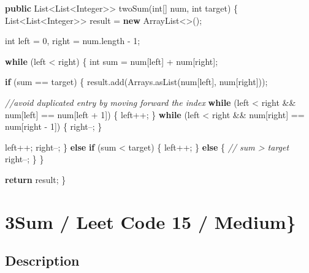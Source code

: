 \documentclass[]{book}
\newenvironment{Shaded}{\begin{snugshade}}{\end{snugshade}}
\newcommand{\BuiltInTok}[1]{#1}
\newcommand{\CommentTok}[1]{\textcolor[rgb]{0.56,0.35,0.01}{\textit{#1}}}
\newcommand{\DataTypeTok}[1]{\textcolor[rgb]{0.13,0.29,0.53}{#1}}
\newcommand{\DecValTok}[1]{\textcolor[rgb]{0.00,0.00,0.81}{#1}}
\newcommand{\FunctionTok}[1]{\textcolor[rgb]{0.00,0.00,0.00}{#1}}
\newcommand{\KeywordTok}[1]{\textcolor[rgb]{0.13,0.29,0.53}{\textbf{#1}}}
\newcommand{\NormalTok}[1]{#1}
\begin{document}
\begin{Shaded}
\begin{Highlighting}[]
\KeywordTok{public} \BuiltInTok{List}\NormalTok{<}\BuiltInTok{List}\NormalTok{<}\BuiltInTok{Integer}\NormalTok{>> }\FunctionTok{twoSum}\NormalTok{(}\DataTypeTok{int}\NormalTok{[] num, }\DataTypeTok{int}\NormalTok{ target) \{}
    \BuiltInTok{List}\NormalTok{<}\BuiltInTok{List}\NormalTok{<}\BuiltInTok{Integer}\NormalTok{>> result = }\KeywordTok{new} \BuiltInTok{ArrayList}\NormalTok{<>();}

    \DataTypeTok{int}\NormalTok{ left = }\DecValTok{0}\NormalTok{, right = num.}\FunctionTok{length}\NormalTok{ - }\DecValTok{1}\NormalTok{;}

    \KeywordTok{while}\NormalTok{ (left < right) \{}
        \DataTypeTok{int}\NormalTok{ sum = num[left] + num[right];}

        \KeywordTok{if}\NormalTok{ (sum == target) \{}
\NormalTok{            result.}\FunctionTok{add}\NormalTok{(}\BuiltInTok{Arrays}\NormalTok{.}\FunctionTok{asList}\NormalTok{(num[left], num[right]));}

            \CommentTok{//avoid duplicated entry by moving forward the index}
            \KeywordTok{while}\NormalTok{ (left < right && num[left] == num[left + }\DecValTok{1}\NormalTok{]) \{}
\NormalTok{                left++;}
\NormalTok{            \}}
            \KeywordTok{while}\NormalTok{ (left < right && num[right] == num[right - }\DecValTok{1}\NormalTok{]) \{}
\NormalTok{                right--;}
\NormalTok{            \}}

\NormalTok{            left++;}
\NormalTok{            right--;}
\NormalTok{        \} }\KeywordTok{else} \KeywordTok{if}\NormalTok{ (sum < target) \{}
\NormalTok{            left++;}
\NormalTok{        \} }\KeywordTok{else}\NormalTok{ \{}
            \CommentTok{// sum > target}
\NormalTok{            right--;}
\NormalTok{        \}}
\NormalTok{    \}}

    \KeywordTok{return}\NormalTok{ result;}
\NormalTok{\}}
\end{Highlighting}
\end{Shaded}

\hypertarget{sum-leet-code-15-medium}{%
\section{3Sum / Leet Code 15 / Medium\}}\label{sum-leet-code-15-medium}}

\hypertarget{description-5}{%
\subsection{Description}\label{description-5}}
\end{document}
